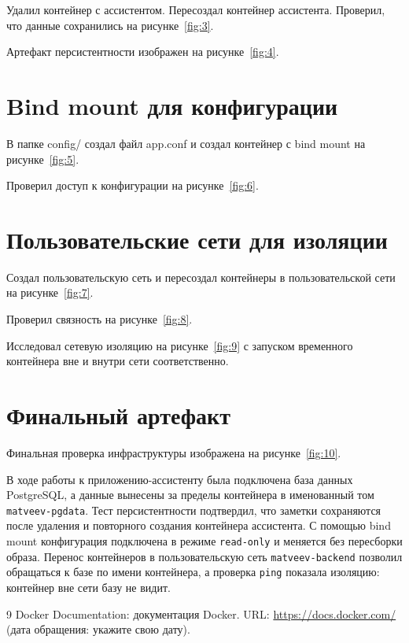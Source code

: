 Удалил контейнер с ассистентом. Пересоздал контейнер ассистента. Проверил, что данные сохранились на рисунке~\ref{fig:3}.


Артефакт персистентности изображен на рисунке~\ref{fig:4}.


\section{Bind mount для конфигурации}

В папке config/ создал файл app.conf и создал контейнер с bind mount на рисунке~\ref{fig:5}.


Проверил доступ к конфигурации на рисунке~\ref{fig:6}.


\section{Пользовательские сети для изоляции}

Создал пользовательскую сеть и пересоздал контейнеры в пользовательской сети на рисунке~\ref{fig:7}.


Проверил связность на рисунке~\ref{fig:8}.


Исследовал сетевую изоляцию на рисунке~\ref{fig:9} с запуском временного контейнера вне и внутри сети соответственно.


\section{Финальный артефакт}

Финальная проверка инфраструктуры изображена на рисунке~\ref{fig:10}.



В ходе работы к приложению-ассистенту была подключена база данных PostgreSQL, а данные вынесены за пределы контейнера в именованный том \texttt{matveev-pgdata}. Тест персистентности подтвердил, что заметки сохраняются после удаления и повторного создания контейнера ассистента. С помощью bind mount конфигурация подключена в режиме \texttt{read-only} и меняется без пересборки образа. Перенос контейнеров в пользовательскую сеть \texttt{matveev-backend} позволил обращаться к базе по имени контейнера, а проверка \texttt{ping} показала изоляцию: контейнер вне сети базу не видит.

\begin{thebibliography}{9}
  Docker Documentation: документация Docker.
  URL: \url{https://docs.docker.com/}
  (дата обращения: укажите свою дату).
\end{thebibliography}

